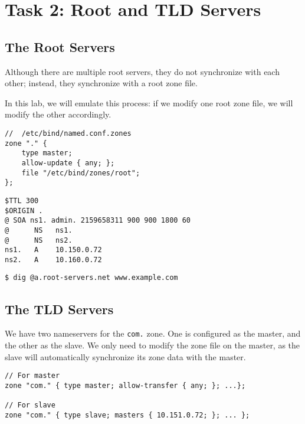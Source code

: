 \section{Task 2: Root and TLD Servers} 


\subsection{The Root Servers} 

Although there are multiple root servers, they do not synchronize with
each other; instead, they synchronize with a root zone file. 

In this lab, we will emulate this process: if we modify one root zone
file, we will modify the other accordingly. 

\begin{lstlisting}
//  /etc/bind/named.conf.zones
zone "." { 
    type master; 
    allow-update { any; }; 
    file "/etc/bind/zones/root"; 
};
\end{lstlisting}
 

\begin{lstlisting}
$TTL 300
$ORIGIN .
@ SOA ns1. admin. 2159658311 900 900 1800 60
@      NS   ns1.
@      NS   ns2.
ns1.   A    10.150.0.72
ns2.   A    10.160.0.72
\end{lstlisting}
 


\begin{lstlisting}
$ dig @a.root-servers.net www.example.com
\end{lstlisting}
 



\subsection{The TLD Servers} 


We have two nameservers for the \texttt{com.} zone. One is configured as 
the master, and the other as the slave. We only need to modify the zone 
file on the master, as the slave will automatically synchronize its 
zone data with the master. 

\begin{lstlisting}
// For master
zone "com." { type master; allow-transfer { any; }; ...};

// For slave
zone "com." { type slave; masters { 10.151.0.72; }; ... };
\end{lstlisting}
 


